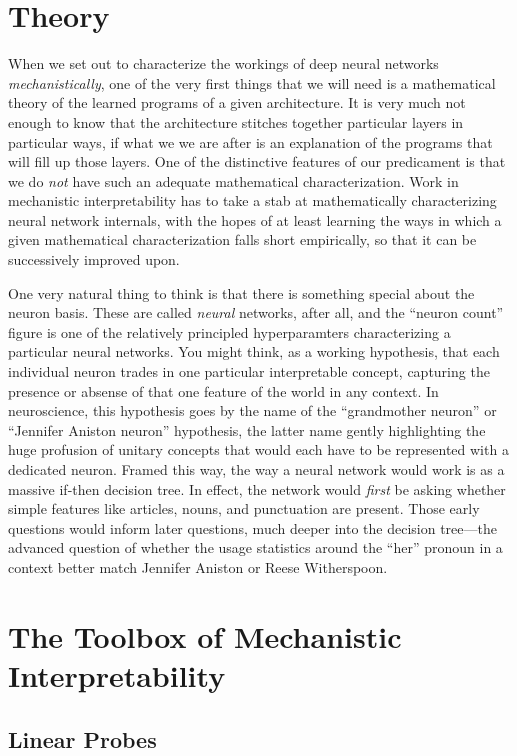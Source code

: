 \section{Theory}
When we set out to characterize the workings of deep neural networks
\emph{mechanistically}, one of the very first things that we will need is a
mathematical theory of the learned programs of a given architecture. It is very
much not enough to know that the architecture stitches together particular
layers in particular ways, if what we we are after is an explanation of the
programs that will fill up those layers. One of the distinctive features of our
predicament is that we do \emph{not} have such an adequate mathematical
characterization. Work in mechanistic interpretability has to take a stab at
mathematically characterizing neural network internals, with the hopes of at
least learning the ways in which a given mathematical characterization falls
short empirically, so that it can be successively improved upon.

One very natural thing to think is that there is something special about the
neuron basis. These are called \emph{neural} networks, after all, and the
``neuron count'' figure is one of the relatively principled hyperparamters
characterizing a particular neural networks. You might think, as a working
hypothesis, that each individual neuron trades in one particular interpretable
concept, capturing the presence or absense of that one feature of the world in
any context. In neuroscience, this hypothesis goes by the name of the
``grandmother neuron'' or ``Jennifer Aniston neuron'' hypothesis, the latter
name gently highlighting the huge profusion of unitary concepts that would each
have to be represented with a dedicated neuron. Framed this way, the way a
neural network would work is as a massive if-then decision tree. In effect, the
network would \emph{first} be asking whether simple features like articles,
nouns, and punctuation are present. Those early questions would inform later
questions, much deeper into the decision tree---the advanced question of
whether the usage statistics around the ``her'' pronoun in a context better
match Jennifer Aniston or Reese Witherspoon.

\section{The Toolbox of Mechanistic Interpretability}

\subsection{Linear Probes}

